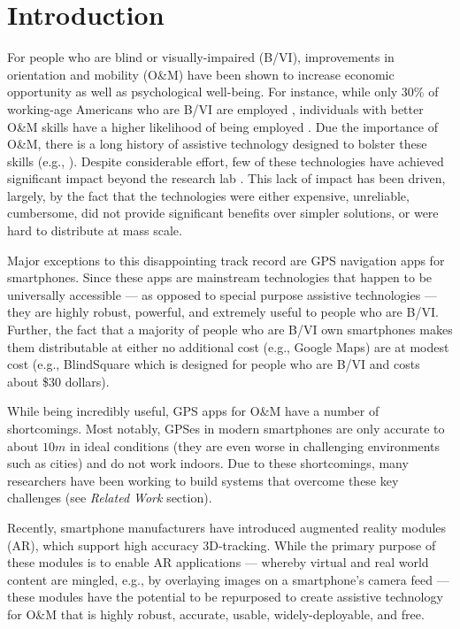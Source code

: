 \documentclass[chi_draft]{sigchi}
\newcommand{\BVI}{B/VI\xspace}
\newcommand{\OM}{O\&M\xspace}
\begin{document}
\section{Introduction}
For people who are blind or visually-impaired (\BVI), improvements in orientation and mobility (\OM) have been shown to increase economic opportunity as well as psychological well-being.  For instance, while only 30\% of working-age Americans who are \BVI are employed \cite{employmentstatistics2017, kirchner1999looking}, individuals with better \OM skills have a higher likelihood of being employed \cite{crudden1998comprehensive, crudden1999barriers, leonard1999factors, o1999employment}.  Due the importance of \OM, there is a long history of assistive technology designed to bolster these skills (e.g., \cite{benjamin1973new, borenstein1997guidecane}).  Despite considerable effort, few of these technologies have achieved significant impact beyond the research lab \cite{wiener2010foundations}.  This lack of impact has been driven, largely, by the fact that the technologies were either expensive, unreliable, cumbersome, did not provide significant benefits over simpler solutions, or were hard to distribute at mass scale.

Major exceptions to this disappointing track record are GPS navigation apps for smartphones.  Since these apps are mainstream technologies that happen to be universally accessible --- as opposed to special purpose assistive technologies --- they are highly robust, powerful, and extremely useful to people who are \BVI.  Further, the fact that a majority of people who are \BVI own smartphones \cite{morris2014blind} makes them distributable at either no additional cost (e.g., Google Maps) are at modest cost (e.g., BlindSquare which is designed for people who are \BVI and costs about \$30 dollars).

While being incredibly useful, GPS apps for \OM have a number of shortcomings.  Most notably, GPSes in modern smartphones are only accurate to about $10m$ in ideal conditions (they are even worse in challenging environments such as cities) and do not work indoors.  Due to these shortcomings, many researchers have been working to build systems that overcome these key challenges (see \emph{Related Work} section).

Recently, smartphone manufacturers have introduced augmented reality modules (AR), which support high accuracy 3D-tracking.  While the primary purpose of these modules is to enable AR applications --- whereby virtual and real world content are mingled, e.g., by overlaying images on a smartphone's camera feed --- these modules have the potential to be repurposed to create assistive technology for \OM that is highly robust, accurate, usable, widely-deployable, and free.
\end{document}
